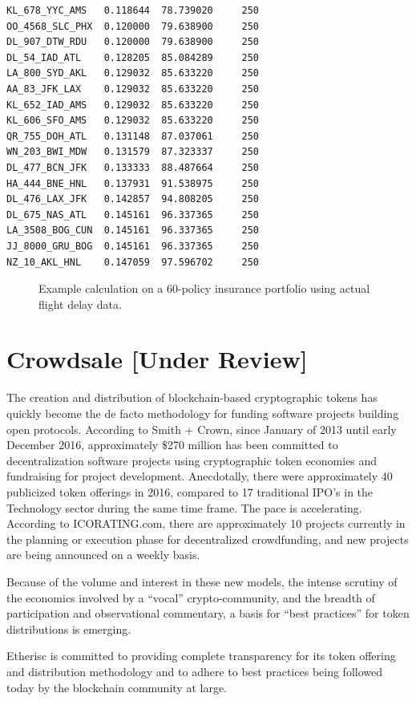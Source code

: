 \documentclass[12pt]{article}
\begin{document}
\begin{verbatim}
KL_678_YYC_AMS   0.118644  78.739020     250
OO_4568_SLC_PHX  0.120000  79.638900     250
DL_907_DTW_RDU   0.120000  79.638900     250
DL_54_IAD_ATL    0.128205  85.084289     250
LA_800_SYD_AKL   0.129032  85.633220     250
AA_83_JFK_LAX    0.129032  85.633220     250
KL_652_IAD_AMS   0.129032  85.633220     250
KL_606_SFO_AMS   0.129032  85.633220     250
QR_755_DOH_ATL   0.131148  87.037061     250
WN_203_BWI_MDW   0.131579  87.323337     250
DL_477_BCN_JFK   0.133333  88.487664     250
HA_444_BNE_HNL   0.137931  91.538975     250
DL_476_LAX_JFK   0.142857  94.808205     250
DL_675_NAS_ATL   0.145161  96.337365     250
LA_3508_BOG_CUN  0.145161  96.337365     250
JJ_8000_GRU_BOG  0.145161  96.337365     250
NZ_10_AKL_HNL    0.147059  97.596702     250
\end{verbatim}
\begin{figure}[H]
    \caption{\footnotesize Example calculation on a 60-policy insurance portfolio using actual flight delay data.}\label{fig2}
\end{figure}

\section{Crowdsale [Under Review]}

The creation and distribution of blockchain-based cryptographic tokens has quickly become the de facto methodology for funding software projects building open protocols.
According to Smith + Crown, since January of 2013 until early December 2016, approximately \$270 million has been committed to decentralization software projects using cryptographic token economies and fundraising for project development. Anecdotally, there were approximately 40 publicized token offerings in 2016, compared to 17 traditional IPO’s in the Technology sector during the same time frame. The pace is accelerating. According to ICORATING.com, there are approximately 10 projects currently in the planning or execution phase for decentralized crowdfunding, and new projects are being announced on a weekly basis.

Because of the volume and interest in these new models, the intense scrutiny of the economics involved by a “vocal” crypto-community, and the breadth of participation and observational commentary, a basis for “best practices” for token distributions is emerging.

Etherisc is committed to providing complete transparency for its token offering and distribution methodology and to adhere to best practices being followed today by the blockchain community at large.
\end{document}
